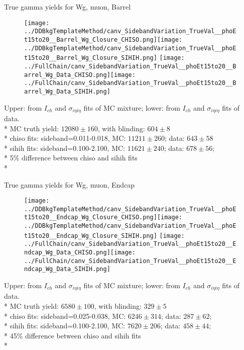 \documentclass{beamer}
\begin{document}
\begin{frame}{True gamma yields for Wg, muon, Barrel}
  \begin{figure}
    \centering
    \texttt{[image: ../DDBkgTemplateMethod/canv\_SidebandVariation\_TrueVal\_\_phoEt15to20\_\_Barrel\_Wg\_Closure\_CHISO.png]}\texttt{[image: ../DDBkgTemplateMethod/canv\_SidebandVariation\_TrueVal\_\_phoEt15to20\_\_Barrel\_Wg\_Closure\_SIHIH.png]}
    \texttt{[image: ../FullChain/canv\_SidebandVariation\_TrueVal\_\_phoEt15to20\_\_Barrel\_Wg\_Data\_CHISO.png]}\texttt{[image: ../FullChain/canv\_SidebandVariation\_TrueVal\_\_phoEt15to20\_\_Barrel\_Wg\_Data\_SIHIH.png]}
  \end{figure}
  \scriptsize Upper: from $I_{ch}$ and $\sigma_{i{\eta}i{\eta}}$ fits of MC mixture; lower: from $I_{ch}$ and $\sigma_{i{\eta}i{\eta}}$ fits of data.\\*
  \scriptsize MC truth yield: $12080{\pm}160$, with blinding: $604{\pm}8$\\*
  \scriptsize chiso fits: sideband=0.011-0.018, MC: $11211{\pm}260$; data: $643{\pm}58$\\*
  \scriptsize sihih fits: sideband=0.100-2.100, MC: $11621{\pm}240$; data: $678{\pm}56$;\\*
  \scriptsize 5\% difference between chiso and sihih fits \\*
\end{frame}

\begin{frame}{True gamma yields for Wg, muon, Endcap}
  \begin{figure}
    \centering
    \texttt{[image: ../DDBkgTemplateMethod/canv\_SidebandVariation\_TrueVal\_\_phoEt15to20\_\_Endcap\_Wg\_Closure\_CHISO.png]}\texttt{[image: ../DDBkgTemplateMethod/canv\_SidebandVariation\_TrueVal\_\_phoEt15to20\_\_Endcap\_Wg\_Closure\_SIHIH.png]}
    \texttt{[image: ../FullChain/canv\_SidebandVariation\_TrueVal\_\_phoEt15to20\_\_Endcap\_Wg\_Data\_CHISO.png]}\texttt{[image: ../FullChain/canv\_SidebandVariation\_TrueVal\_\_phoEt15to20\_\_Endcap\_Wg\_Data\_SIHIH.png]}
  \end{figure}
  \scriptsize Upper: from $I_{ch}$ and $\sigma_{i{\eta}i{\eta}}$ fits of MC mixture; lower: from $I_{ch}$ and $\sigma_{i{\eta}i{\eta}}$ fits of data.\\*
  \scriptsize MC truth yield: $6580{\pm}100$, with blinding: $329{\pm}5$\\*
  \scriptsize chiso fits: sideband=0.025-0.038, MC:  $6246{\pm}314$; data: $287{\pm}62$;\\*
  \scriptsize sihih fits: sideband=0.100-2.100, MC:  $7620{\pm}206$; data: $458{\pm}44$;\\*
  \scriptsize 45\% difference between chiso and sihih fits \\*
\end{frame}
\end{document}
